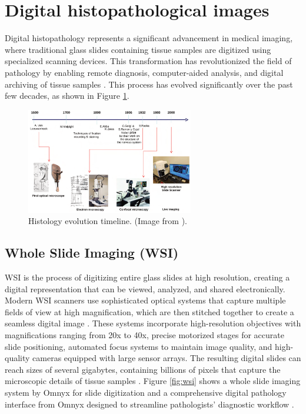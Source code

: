 \section{Digital histopathological images}


Digital histopathology represents a significant advancement in
medical imaging, where traditional glass slides containing tissue
samples are digitized using specialized scanning devices. This
transformation has revolutionized the field of pathology by enabling
remote diagnosis, computer-aided analysis, and digital archiving of
tissue samples \cite{AmgadEtAl2019}. This process has evolved
significantly over the past few decades, as shown in Figure
\ref{fig:histology_evolution}.

\begin{figure}[h]
  \centering
  \includegraphics[width=0.65\textwidth]{Cap2/Figures/histology_evolution.png}
  \caption{Histology evolution timeline. (Image from \cite{MazzariniEtAl2021}).}
  \label{fig:histology_evolution}
\end{figure}

\subsection{Whole Slide Imaging (WSI)}

\gls{WSI} is the process of digitizing entire glass
slides at high resolution, creating a digital representation that can
be viewed, analyzed, and shared electronically. Modern \gls{WSI} scanners
use sophisticated optical systems that capture multiple fields of
view at high magnification, which are then stitched together to
create a seamless digital image \cite{DingyiEtAl2025}. These systems incorporate
high-resolution objectives with magnifications ranging from 20x to
40x, precise motorized stages for accurate slide positioning,
automated focus systems to maintain image quality, and high-quality
cameras equipped with large sensor arrays. The resulting digital
slides can reach sizes of several gigabytes, containing billions of
pixels that capture the microscopic details of tissue samples
\cite{DingyiEtAl2025}. Figure \ref{fig:wsi} shows a whole slide
imaging system by Omnyx for slide digitization and a comprehensive
digital pathology interface from Omnyx designed to streamline
pathologists' diagnostic workflow \cite{FarahaniEtAl2015}.

